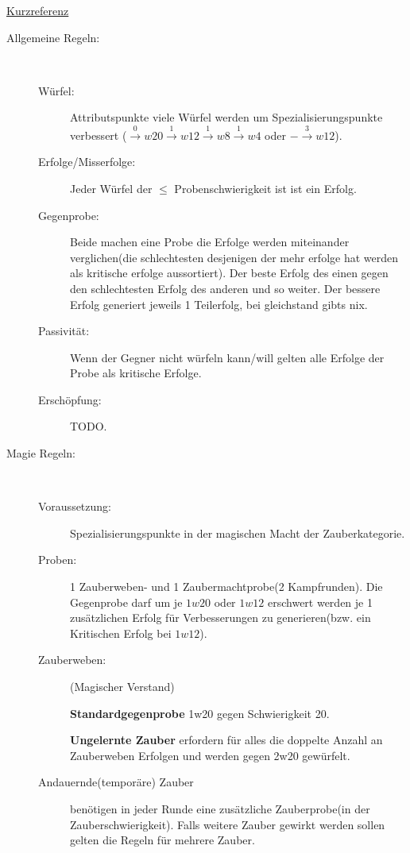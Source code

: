 \begin{landscape}
\newpage
\thispagestyle{empty} %

\begin{center}
{\Large \underline {Kurzreferenz}}
\vskip 0.3cm
\begin{minipage}[t]{0.45\paperheight}
\begin{description}
\item[Allgemeine Regeln:]\ 
	\begin{description}
	\item[Würfel:] Attributspunkte viele Würfel werden um Spezialisierungspunkte verbessert ($\xrightarrow{0}w20\xrightarrow{1}w12\xrightarrow{1}w8\xrightarrow{1}w4$ oder $-\xrightarrow{3}w12$).
	\item[Erfolge/Misserfolge:]Jeder Würfel der $\leq$ Probenschwierigkeit ist ist ein Erfolg.
	\item[Gegenprobe:]Beide machen eine Probe die Erfolge werden miteinander verglichen(die schlechtesten desjenigen der mehr erfolge hat werden als kritische erfolge aussortiert). Der beste Erfolg des einen gegen den schlechtesten Erfolg des anderen und so weiter. Der bessere Erfolg generiert jeweils 1 Teilerfolg, bei gleichstand gibts nix.
	\item[Passivität:]Wenn der Gegner nicht würfeln kann/will gelten alle Erfolge der Probe als kritische Erfolge.
	\item[Erschöpfung:] TODO.
	\end{description}
\item[Magie Regeln:]\ 
	\begin{description}
	\item[Voraussetzung:] Spezialisierungspunkte in der magischen Macht der Zauberkategorie.
	\item[Proben:] 1 Zauberweben- und 1 Zaubermachtprobe(2 Kampfrunden). Die Gegenprobe darf um je $1w20$ oder $1w12$ erschwert werden je 1 zusätzlichen Erfolg für Verbesserungen zu generieren(bzw. ein Kritischen Erfolg bei $1w12$).
	\item[Zauberweben:](Magischer Verstand)
		
	\textbf{Standardgegenprobe} 1w20 gegen Schwierigkeit 20.

	\textbf{Ungelernte Zauber} erfordern für alles die doppelte Anzahl an Zauberweben Erfolgen und werden gegen 2w20 gewürfelt.
	
	\item[Andauernde(temporäre) Zauber] benötigen in jeder Runde eine zusätzliche Zauberprobe(in der Zauberschwierigkeit). Falls weitere Zauber gewirkt werden sollen gelten die Regeln für mehrere Zauber.
	

\end{description}
\end{description}
\end{minipage}
\end{center}
\end{landscape}
